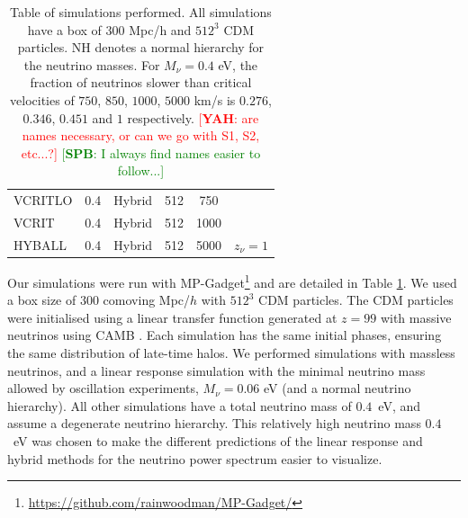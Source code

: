 \documentclass[useAMS, usenatbib]{mnras}
\newcommand{\spb}[1]{{\textcolor{green}{[{\bf SPB}: #1]}}}
\newcommand{\yah}[1]{{\textcolor{red}{[{\bf YAH}: #1]}}}
\begin{document}
\begin{table}
\begin{center}
\begin{tabular}{|l|c|c|c|c|l|}
VCRITLO    &     0.4             &   Hybrid      & 512       & 750 & \\
VCRIT    &     0.4             &   Hybrid      & 512       & 1000 & \\
HYBALL    &     0.4             &   Hybrid      & 512       & 5000 & $z_\nu = 1$ \\
\hline
\end{tabular}
\end{center}
\caption{Table of simulations performed. All simulations have a box of $300$ Mpc/h
and $512^3$ CDM particles. NH denotes a normal hierarchy for the neutrino masses.
For $M_\nu = 0.4$ eV, the fraction of neutrinos slower than critical velocities of $750$, $850$, $1000$, $5000$ km/s is $0.276$, $0.346$, $0.451$ and $1$ respectively. \yah{are names necessary, or can we go with S1, S2, etc...?} \spb{I always find names easier to follow...}}
\label{tab:simulations}
\end{table}


%

Our simulations were run with MP-Gadget\footnote{\url{https://github.com/rainwoodman/MP-Gadget/}} and are detailed in Table \ref{tab:simulations}. We used a box size of $300$ comoving Mpc/$h$ with $512^3$ CDM particles.
The CDM particles were initialised using a linear transfer function generated at $z=99$ with massive neutrinos using CAMB \citep{CAMB_neutrinos}. Each simulation has the same initial phases, ensuring the same distribution of late-time halos. We performed simulations with massless neutrinos, and a linear response simulation with the minimal neutrino mass allowed by oscillation experiments, $M_\nu = 0.06$ eV (and a normal neutrino hierarchy). All other simulations have a total neutrino mass of $0.4$~eV, and assume a degenerate neutrino hierarchy. This relatively high neutrino mass $0.4$~eV was chosen to make the different predictions of the linear response and hybrid methods for the neutrino power spectrum easier to visualize.
\end{document}
